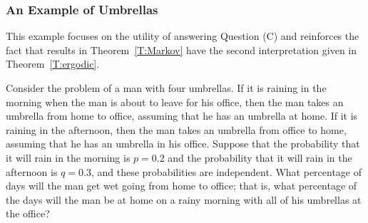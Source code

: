 \documentclass{ximera}
\begin{document}
\subsubsection*{An Example of Umbrellas}

This example focuses on the utility of answering Question (C) and reinforces
the fact that results in Theorem~\ref{T:Markov} have the second
interpretation given in Theorem~\ref{T:ergodic}.

Consider the problem of a man with four umbrellas.  If it is raining in the
morning when the man is about to leave for his office, then the man takes an
umbrella from home to office, assuming that he has an umbrella at home.  If it
is raining in the afternoon, then the man takes an umbrella from office to
home, assuming that he has an umbrella in his office.  Suppose that the
probability that it will rain in the morning is $p=0.2$ and the probability
that it will rain in the afternoon is $q=0.3$, and these probabilities are
independent.  What percentage of days will the man get wet going from home
to office; that is, what percentage of the days will the man be at home on a
rainy morning with all of his umbrellas at the office?
\end{document}
